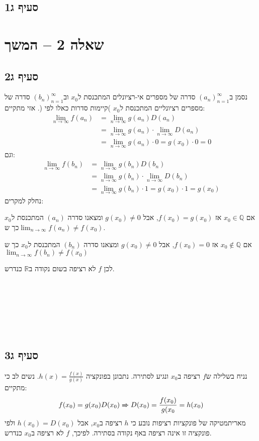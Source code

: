 \documentclass[11pt, oneside]{article}
\newcommand{\qed}{\R{$\blacksquare$}}
\newcommand{\br}{\\\\\\\\\\\\\\}
\newcommand{\logr}[1]{\xRightarrow[\text{#1}]{}}
\newcommand{\mR}{\mathbb{R}}
\newcommand{\mQ}{\mathbb{Q}}
\newcommand{\m}[3]{\R{משפט #3#2.#1}}
\newcommand{\lem}[3]{\R{למה #3#2.#1}}
\begin{document}
\subsection*{סעיף ג1}
\clearpage

\section*{שאלה 2 -- המשך}
\subsection*{סעיף ג2}
נסמן ב$(a_{n})^{\infty}_{n=1}$ סדרה של מספרים אי-רציונלים המתכנסת ל$x_{0}$ וב$(b_{n})^{\infty}_{n=1}$ סדרה של מספרים רציונליים המתכנסת ל$x_{0}$ )קיימות סדרות כאלו לפי \lem{5}{9}{}(. אזי מתקיים:
\begin{align*}
\lim_{n \to \infty} f(a_{n})
& = \lim_{n \to \infty} g(a_{n})D(a_{n})\\
& = \lim_{n \to \infty} g(a_{n}) \cdot \lim_{n \to \infty} D(a_{n})\\
& = \lim_{n \to \infty} g(a_{n}) \cdot 0 = g(x_{0}) \cdot 0 = 0
\end{align*}
וגם:
\begin{align*}
\lim_{n \to \infty} f(b_{n})
& = \lim_{n \to \infty} g(b_{n})D(b_{n})\\
& = \lim_{n \to \infty} g(b_{n}) \cdot \lim_{n \to \infty} D(b_{n})\\
& = \lim_{n \to \infty} g(b_{n}) \cdot 1 = g(x_{0}) \cdot 1 = g(x_{0})
\end{align*}
נחלק למקרים:

אם $x_{0} \in \mQ$ אז $f(x_{0}) = g(x_{0})$, אבל $g(x_{0}) \neq 0$ ומצאנו סדרה $(a_{n})$ המתכנסת ל$x_{0}$ כך ש$\lim_{n \to \infty} f(a_{n}) \neq f(x_{0})$.

אם $x_{0} \not\in \mQ$ אז $f(x_{0}) = 0$, אבל $g(x_{0}) \neq 0$ ומצאנו סדרה $(b_{n})$ המתכנסת ל$x_{0}$ כך ש$\lim_{n \to \infty} f(b_{n}) \neq f(x_{0})$

לכן $f$ לא רציפה בשום נקודה ב$\mR$ כנדרש.
\br\qed
\bigskip

\subsection*{סעיף ג3}
נניח בשלילה ש$f$ רציפה ב$x_{0}$ ונגיע לסתירה. נתבונן בפונקציה $h(x) = \frac{f(x)}{g(x)}$. נשים לב כי מתקיים:
\[
f(x_{0}) = g(x_{0})D(x_{0}) \logr{} D(x_{0}) = \frac{f(x_{0})}{g(x_{0}} = h(x_{0})
\]
מאריתמטיקה של פונקציות רציפות נובע כי $h$ רציפה ב$x_{0}$, אבל $h(x_{0}) = D(x_{0})$ ולפי \m{5}{01}{} פונקציה זו אינה רציפה באף נקודה בסתירה. לפיכך, $f$ לא רציפה ב$x_{0}$ כנדרש.
\br\qed
\clearpage
\end{document}
